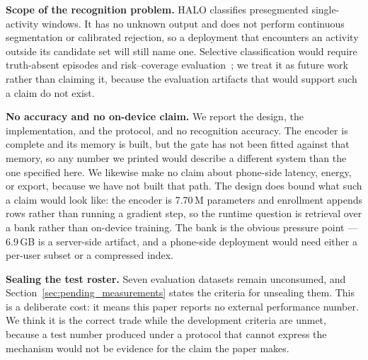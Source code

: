 \textbf{Scope of the recognition problem.}
HALO classifies presegmented single-activity windows. It has no unknown output and does not perform
continuous segmentation or calibrated rejection, so a deployment that encounters an activity outside
its candidate set will still name one. Selective classification would require truth-absent episodes
and risk--coverage evaluation~\cite{selectiveclass}; we treat it as future work rather than claiming
it, because the evaluation artifacts that would support such a claim do not exist.

\textbf{No accuracy and no on-device claim.}
We report the design, the implementation, and the protocol, and no recognition accuracy. The
encoder is complete and its memory is built, but the gate has not been fitted against that memory,
so any number we printed would describe a different system than the one specified here. We likewise
make no claim about phone-side latency, energy, or export, because we have not built that path. The
design does bound what such a claim would look like: the encoder is 7.70\,M parameters and
enrollment appends rows rather than running a gradient step, so the runtime question is retrieval
over a bank rather than on-device training. The bank is the obvious pressure point --- 6.9\,GB is a
server-side artifact, and a phone-side deployment would need either a per-user subset or a
compressed index.

\textbf{Sealing the test roster.}
Seven evaluation datasets remain unconsumed, and Section~\ref{sec:pending_measurements} states the
criteria for unsealing them. This is a deliberate cost: it means this paper reports no external
performance number. We think it is the correct trade while the development criteria are unmet,
because a test number produced under a protocol that cannot express the mechanism would not be
evidence for the claim the paper makes.
